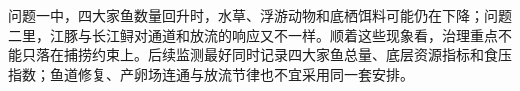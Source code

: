 问题一中，四大家鱼数量回升时，水草、浮游动物和底栖饵料可能仍在下降；问题二里，江豚与长江鲟对通道和放流的响应又不一样。顺着这些现象看，治理重点不能只落在捕捞约束上。后续监测最好同时记录四大家鱼总量、底层资源指标和食压指数；鱼道修复、产卵场连通与放流节律也不宜采用同一套安排。
